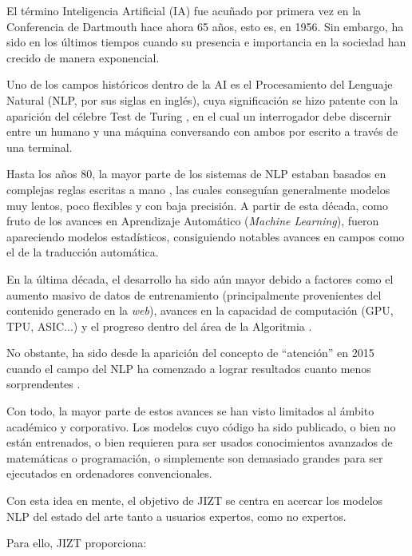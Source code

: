   \label{chapter:intro}

\vspace{-0.5cm}

El término Inteligencia Artificial (IA) fue acuñado por primera vez en la Conferencia de Dartmouth \cite{crevier95} hace ahora 65 años, esto es, en 1956. Sin embargo, ha sido en los últimos tiempos cuando su presencia e importancia en la sociedad han crecido de manera exponencial.

Uno de los campos históricos dentro de la AI es el Procesamiento del Lenguaje Natural (NLP, por sus siglas en inglés), cuya significación se hizo patente con la aparición del célebre Test de Turing \cite{turing50}, en el cual un interrogador debe discernir entre un humano y una máquina conversando con ambos por escrito a través de una terminal.

Hasta los años 80, la mayor parte de los sistemas de NLP estaban basados en complejas reglas escritas a mano \cite{mccorduck79}, las cuales conseguían generalmente modelos muy lentos, poco flexibles y con baja precisión. A partir de esta década, como fruto de los avances en Aprendizaje Automático (\emph{Machine Learning}), fueron apareciendo modelos estadísticos, consiguiendo notables avances en campos como el de la traducción automática.

En la última década, el desarrollo ha sido aún mayor debido a factores como el aumento masivo de datos de entrenamiento (principalmente provenientes del contenido generado en la \emph{web}), avances en la capacidad de computación (GPU, TPU, ASIC...) y el progreso dentro del área de la Algoritmia \cite{rahmfeld19}.

No obstante, ha sido desde la aparición del concepto de ``atención'' en 2015 \cite{luong15, bahdanau16, vaswani17} cuando el campo del NLP ha comenzado a lograr resultados cuanto menos sorprendentes \cite{macaulay20, wiggers21}.

Con todo, la mayor parte de estos avances se han visto limitados al ámbito académico y corporativo. Los modelos cuyo código ha sido publicado, o bien no están entrenados, o bien requieren para ser usados conocimientos avanzados de matemáticas o programación, o simplemente son demasiado grandes para ser ejecutados en ordenadores convencionales.

Con esta idea en mente, el objetivo de JIZT se centra en acercar los modelos NLP del estado del arte tanto a usuarios expertos, como no expertos.

Para ello, JIZT proporciona:

